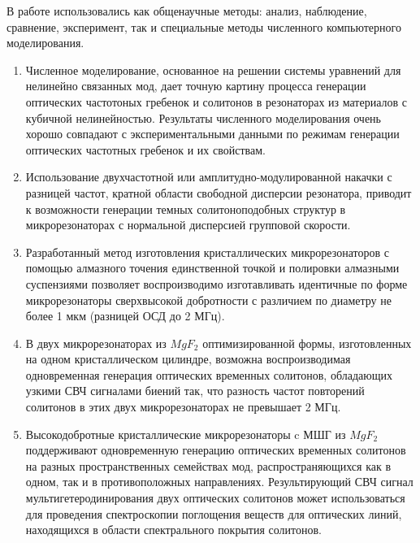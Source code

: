 {\methods} В работе использовались как общенаучные методы: анализ, наблюдение, сравнение, эксперимент, так и специальные методы численного компьютерного моделирования.

{}
\begin{enumerate}
  \item Численное моделирование, основанное на решении системы уравнений для нелинейно связанных мод, дает точную картину процесса генерации оптических частотоных гребенок и солитонов в резонаторах из материалов с кубичной нелинейностью. Результаты численного моделирования очень хорошо совпадают с экспериментальными данными по режимам генерации оптических частотных гребенок и их свойствам.
  \item Использование двухчастотной или амплитудно-модулированной накачки с разницей частот, кратной области свободной дисперсии резонатора, приводит к возможности генерации темных солитоноподобных структур в микрорезонаторах с нормальной дисперсией групповой скорости.
  \item Разработанный метод изготовления кристаллических микрорезонаторов с помощью алмазного точения единственной точкой и полировки алмазными суспензиями позволяет воспроизводимо изготавливать идентичные по форме микрорезонаторы сверхвысокой добротности с различием по диаметру не более 1 мкм (разницей ОСД до 2 МГц).
  \item В двух микрорезонаторах из $MgF_2$ оптимизированной формы, изготовленных на одном кристаллическом цилиндре, возможна воспроизводимая одновременная генерация оптических временных солитонов, обладающих узкими СВЧ сигналами биений так, что разность частот повторений солитонов в этих двух микрорезонаторах не превышает 2 МГц.
  \item Высокодобротные кристаллические микрорезонаторы c МШГ из $MgF_2$ поддерживают одновременную генерацию оптических временных солитонов на разных пространственных семействах мод, распространяющихся как в одном, так и в противоположных направлениях. Результирующий СВЧ сигнал мультигетеродинирования двух оптических солитонов может использоваться для проведения спектроскопии поглощения веществ для оптических линий, находящихся в области спектрального покрытия солитонов.
\end{enumerate}

